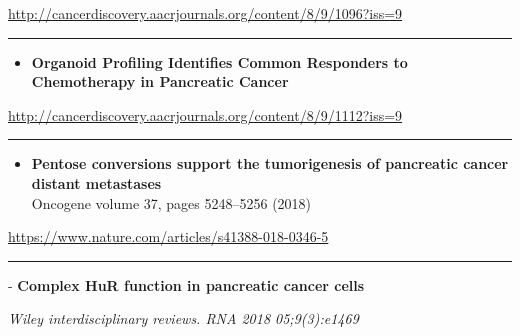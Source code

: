 \documentclass[]{article}
\providecommand{\tightlist}{%
  \setlength{\itemsep}{0pt}\setlength{\parskip}{0pt}}
\begin{document}
\url{http://cancerdiscovery.aacrjournals.org/content/8/9/1096?iss=9}

\begin{center}\rule{0.5\linewidth}{\linethickness}\end{center}

\begin{itemize}
\tightlist
\item
  \textbf{Organoid Profiling Identifies Common Responders to
  Chemotherapy in Pancreatic Cancer}
\end{itemize}

\url{http://cancerdiscovery.aacrjournals.org/content/8/9/1112?iss=9}

\begin{center}\rule{0.5\linewidth}{\linethickness}\end{center}

\begin{itemize}
\tightlist
\item
  \textbf{Pentose conversions support the tumorigenesis of pancreatic
  cancer distant metastases}\\
  Oncogene volume 37, pages 5248--5256 (2018)
\end{itemize}

\url{https://www.nature.com/articles/s41388-018-0346-5}

\begin{center}\rule{0.5\linewidth}{\linethickness}\end{center}

 - \textbf{Complex HuR function in pancreatic cancer cells}

\emph{Wiley interdisciplinary reviews. RNA 2018 05;9(3):e1469}
\end{document}
